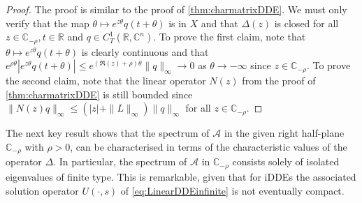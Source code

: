 \documentclass[english]{myarticle}
\begin{document}
\begin{sloppypar}
\begin{theorem}
\end{theorem}
\begin{proof}
The proof is similar to the proof of \cref{thm:charmatrixDDE}. We must only verify that the map $\theta \mapsto e^{z\theta}q(t+\theta)$ is in $X$ and that $\Delta(z)$ is closed for all $z \in \mathbb{C}_{-\rho}, t \in \mathbb{R}$ and $q \in C_T^1(\mathbb{R},\mathbb{C}^n)$. To prove the first claim, note that $\theta \mapsto e^{z\theta}q(t+\theta)$ is clearly continuous and that $e^{\rho \theta} |e^{z\theta}q(t+\theta)| \leq e^{(\Re(z) + \rho)\theta} \|q\|_\infty \to 0$ as $\theta \to - \infty$ since $z \in \mathbb{C}_{-\rho}$. To prove the second claim, note that the linear operator $N(z)$ from the proof of \cref{thm:charmatrixDDE} is still bounded since $\|N(z)q\|_\infty \leq (|z| + \|L\|_\infty) \|q\|_\infty$ for all $z \in \mathbb{C}_{-\rho}$.
\end{proof}

The next key result shows that the spectrum of $\mathcal{A}$ in the given right half-plane $\mathbb{C}_{-\rho}$ with $\rho > 0$, can be characterised in terms of the characteristic values of the operator $\Delta$. In particular, the spectrum of $\mathcal{A}$ in $\mathbb{C}_{-\rho}$ consists solely of isolated eigenvalues of finite type. This is remarkable, given that for iDDEs the associated solution operator $U(\cdot,s)$ of \eqref{eq:LinearDDEinfinite} is not eventually compact.


\end{sloppypar}
\end{document}
